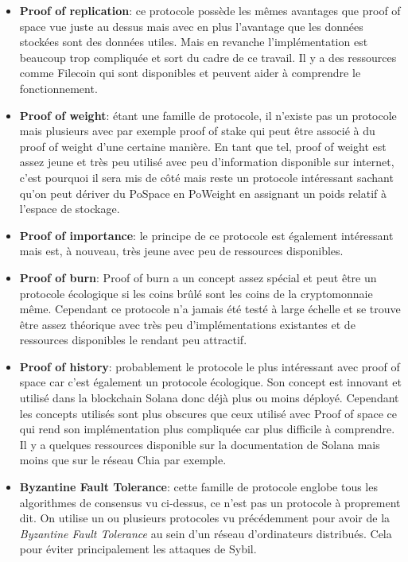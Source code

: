 \begin{itemize}
    \item \textbf{Proof of replication}: ce protocole possède les mêmes avantages que proof of space vue juste au dessus mais avec en plus l'avantage que les données stockées sont des données utiles. Mais en revanche l'implémentation est beaucoup trop compliquée et sort du cadre de ce travail. Il y a des ressources comme Filecoin qui sont disponibles et peuvent aider à comprendre le fonctionnement.
    \item \textbf{Proof of weight}: étant une famille de protocole, il n'existe pas un protocole mais plusieurs avec par exemple proof of stake qui peut être associé à du proof of weight d'une certaine manière. En tant que tel, proof of weight est assez jeune et très peu utilisé avec peu d'information disponible sur internet, c'est pourquoi il sera mis de côté mais reste un protocole intéressant sachant qu'on peut dériver du PoSpace en PoWeight en assignant un poids relatif à l'espace de stockage.
    \item \textbf{Proof of importance}: le principe de ce protocole est également intéressant mais est, à nouveau, très jeune avec peu de ressources disponibles.
    \item \textbf{Proof of burn}: Proof of burn a un concept assez spécial et peut être un protocole écologique si les coins brûlé sont les coins de la cryptomonnaie même. Cependant ce protocole n'a jamais été testé à large échelle et se trouve être assez théorique avec très peu d'implémentations existantes et de ressources disponibles le rendant peu attractif.
    \item \textbf{Proof of history}: probablement le protocole le plus intéressant avec proof of space car c'est également un protocole écologique. Son concept est innovant et utilisé dans la blockchain Solana donc déjà plus ou moins déployé. Cependant les concepts utilisés sont plus obscures que ceux utilisé avec Proof of space ce qui rend son implémentation plus compliquée car plus difficile à comprendre. Il y a quelques ressources disponible sur la documentation de Solana mais moins que sur le réseau Chia par exemple.
    \item \textbf{Byzantine Fault Tolerance}: cette famille de protocole englobe tous les algorithmes de consensus vu ci-dessus, ce n'est pas un protocole à proprement dit. On utilise un ou plusieurs protocoles vu précédemment pour avoir de la \textit{Byzantine Fault Tolerance} au sein d'un réseau d'ordinateurs distribués. Cela pour éviter principalement les attaques de Sybil.
\end{itemize}

